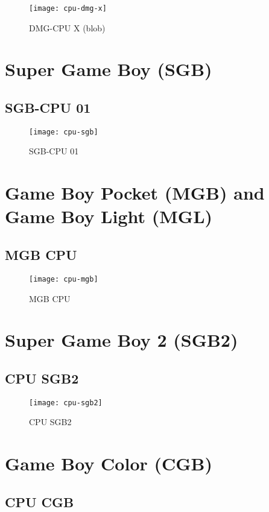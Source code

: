 \begin{figure}[H]
  \centering
  \texttt{[image: cpu-dmg-x]}
  \caption{DMG-CPU X (blob)}
\end{figure}

\section{Super Game Boy (SGB)}

\subsection{SGB-CPU 01}

\begin{figure}[H]
  \centering
  \texttt{[image: cpu-sgb]}
  \caption{SGB-CPU 01}
\end{figure}

\section{Game Boy Pocket (MGB) and Game Boy Light (MGL)}

\subsection{MGB CPU}

\begin{figure}[H]
  \centering
  \texttt{[image: cpu-mgb]}
  \caption{MGB CPU}
\end{figure}

\section{Super Game Boy 2 (SGB2)}

\subsection{CPU SGB2}

\begin{figure}[H]
  \centering
  \texttt{[image: cpu-sgb2]}
  \caption{CPU SGB2}
\end{figure}

\section{Game Boy Color (CGB)}

\subsection{CPU CGB}

